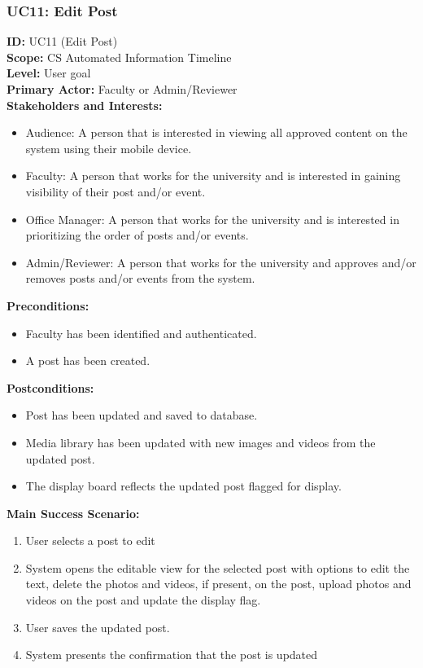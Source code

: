 \documentclass{article}
\begin{document}
\subsubsection{UC11: Edit Post}
\textbf{ID:} UC11 (Edit Post) \\
\textbf{Scope:} CS Automated Information Timeline \\
\textbf{Level:} User goal \\
\textbf{Primary Actor:} Faculty or Admin/Reviewer \\
\textbf{Stakeholders and Interests:}
\begin{itemize}
    \item Audience: A person that is interested in viewing all approved content on the system using their mobile device.
    \item Faculty: A person that works for the university and is interested in gaining visibility of their post and/or event.
    \item Office Manager: A person that works for the university and is interested in prioritizing the order of posts and/or events.
    \item Admin/Reviewer: A person that works for the university and approves and/or removes posts and/or events from the system.
\end{itemize}
\textbf{Preconditions:}
\begin{itemize}
    \item Faculty has been identified and authenticated.
    \item A post has been created.
\end{itemize}
\textbf{Postconditions:}
\begin{itemize}
    \item Post has been updated and saved to database.
    \item Media library has been updated with new images and videos from the updated post.
    \item The display board reflects the updated post flagged for display.
\end{itemize}
\textbf{Main Success Scenario:}
\begin{enumerate}
    \item User selects a post to edit
    \item System opens the editable view for the selected post with options to edit the text, delete the photos and videos, if present, on the post, upload photos and videos on the post and update the display flag.
    \item User saves the updated post.
    \item System presents the confirmation that the post is updated
\end{enumerate}
\end{document}
